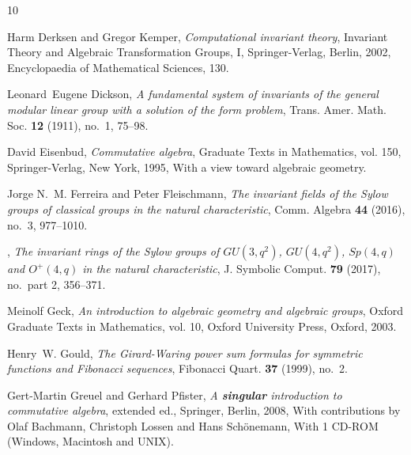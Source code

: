 \documentclass{amsart}
\begin{document}
\begin{thebibliography}{10}

Harm Derksen and Gregor Kemper, \emph{Computational invariant theory},
  Invariant Theory and Algebraic Transformation Groups, I, Springer-Verlag,
  Berlin, 2002, Encyclopaedia of Mathematical Sciences, 130. 

Leonard~Eugene Dickson, \emph{A fundamental system of invariants of the general
  modular linear group with a solution of the form problem}, Trans. Amer. Math.
  Soc. \textbf{12} (1911), no.~1, 75--98. 

David Eisenbud, \emph{Commutative algebra}, Graduate Texts in Mathematics, vol.
  150, Springer-Verlag, New York, 1995, With a view toward algebraic geometry.

Jorge N.~M. Ferreira and Peter Fleischmann, \emph{The invariant fields of the
  {S}ylow groups of classical groups in the natural characteristic}, Comm.
  Algebra \textbf{44} (2016), no.~3, 977--1010. 

\bysame, \emph{The invariant rings of the {S}ylow groups of {$GU(3,q^2)$},
  {$GU(4,q^2)$}, {$Sp(4,q)$} and {$O^+(4,q)$} in the natural characteristic},
  J. Symbolic Comput. \textbf{79} (2017), no.~part 2, 356--371. 

 Meinolf Geck, 
 \emph{An introduction to algebraic geometry and algebraic groups},
 Oxford Graduate Texts in Mathematics, vol. 10,
 Oxford University Press, Oxford, 2003.

Henry~W. Gould, \emph{The {G}irard-{W}aring power sum formulas for symmetric
  functions and {F}ibonacci sequences}, Fibonacci Quart. \textbf{37} (1999),
  no.~2. 

Gert-Martin Greuel and Gerhard Pfister, \emph{A {\bf {s}ingular} introduction
  to commutative algebra}, extended ed., Springer, Berlin, 2008, With
  contributions by Olaf Bachmann, Christoph Lossen and Hans Sch\"onemann, With
  1 CD-ROM (Windows, Macintosh and UNIX). 


\end{thebibliography}
\end{document}
